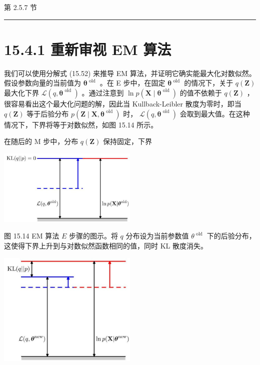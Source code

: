 \documentclass[10pt]{report}
\newcommand{\HRule}{\begin{center}\rule{0.9\linewidth}{0.2mm}\end{center}}
\begin{document}
第 2.5.7 节

\HRule

\section*{15.4.1 重新审视 EM 算法}

我们可以使用分解式 (15.52) 来推导 EM 算法，并证明它确实能最大化对数似然。假设参数向量的当前值为 \({\mathbf{\theta }}^{\text{ old }}\) 。在 E 步中，在固定 \({\mathbf{\theta }}^{\text{ old }}\) 的情况下，关于 \(q\left( \mathbf{Z}\right)\) 最大化下界 \(\mathcal{L}\left( {q,{\mathbf{\theta }}^{\text{ old }}}\right)\) 。通过注意到 \(\ln p\left( {\mathbf{X} \mid  {\mathbf{\theta }}^{\text{ old }}}\right)\) 的值不依赖于 \(q\left( \mathbf{Z}\right)\) ，很容易看出这个最大化问题的解，因此当 Kullback-Leibler 散度为零时，即当 \(q\left( \mathbf{Z}\right)\) 等于后验分布 \(p\left( {\mathbf{Z} \mid  \mathbf{X},{\mathbf{\theta }}^{\text{ old }}}\right)\) 时， \(\mathcal{L}\left( {q,{\mathbf{\theta }}^{\text{ old }}}\right)\) 会取到最大值。在这种情况下，下界将等于对数似然，如图 15.14 所示。

在随后的 M 步中，分布 \(q\left( \mathbf{Z}\right)\) 保持固定，下界

\begin{center}
\includegraphics[max width=0.5\textwidth]{images/0194e279-9b28-703a-88f4-c3ac21e2010d_505_830_1610_722_393_0.jpg}
\end{center}
\hspace*{3em} 

图 15.14 EM 算法 \(E\) 步骤的图示。将 \(q\) 分布设为当前参数值 \({\theta }^{\text{ old }}\) 下的后验分布，这使得下界上升到与对数似然函数相同的值，同时 KL 散度消失。

\begin{center}
\includegraphics[max width=0.5\textwidth]{images/0194e279-9b28-703a-88f4-c3ac21e2010d_506_925_343_624_511_0.jpg}
\end{center}
\hspace*{3em} 
\end{document}
